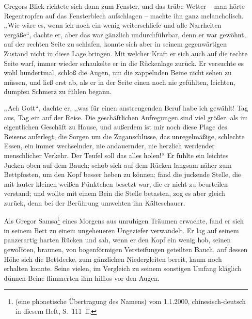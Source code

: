\documentclass[]{zchinr}
\begin{document}
Gregors Blick richtete sich dann zum Fenster, und das trübe Wetter -- man hörte Regentropfen auf das Fensterblech aufschlagen -- machte ihn ganz melancholisch. ,,Wie wäre es, wenn ich noch ein wenig weiterschliefe und alle Narrheiten vergäße``, dachte er, aber das war gänzlich undurchführbar, denn er war gewöhnt, auf der rechten Seite zu schlafen, konnte sich aber in seinem gegenwärtigen Zustand nicht in diese Lage bringen. Mit welcher Kraft er sich auch auf die rechte Seite warf, immer wieder schaukelte er in die Rückenlage zurück. Er versuchte es wohl hundertmal, schloß die Augen, um die zappelnden Beine nicht sehen zu müssen, und ließ erst ab, als er in der Seite einen noch nie gefühlten, leichten, dumpfen Schmerz zu fühlen begann.

,,Ach Gott``, dachte er, ,,was für einen anstrengenden Beruf habe ich gewählt! Tag aus, Tag ein auf der Reise. Die geschäftlichen Aufregungen sind viel größer, als im eigentlichen Geschäft zu Hause, und außerdem ist mir noch diese Plage des Reisens auferlegt, die Sorgen um die Zuganschlüsse, das unregelmäßige, schlechte Essen, ein immer wechselnder, nie andauernder, nie herzlich werdender menschlicher Verkehr. Der Teufel soll das alles holen!{}`` Er fühlte ein leichtes Jucken oben auf dem Bauch; schob sich auf dem Rücken langsam näher zum Bettpfosten, um den Kopf besser heben zu können; fand die juckende Stelle, die mit lauter kleinen weißen Pünktchen besetzt war, die er nicht zu beurteilen verstand; und wollte mit einem Bein die Stelle betasten, zog es aber gleich zurück, denn bei der Berührung umwehten ihn Kälteschauer.



\printtitle

Als Gregor Samsa\footnote{ (eine phonetische Übertragung des Namens) vom 1.1.2000, chinesisch-deutsch in diesem Heft, S.~111~ff.} eines Morgens aus unruhigen Träumen erwachte, fand er sich in seinem Bett zu einem ungeheueren Ungeziefer verwandelt. Er lag auf seinem panzerartig harten Rücken und sah, wenn er den Kopf ein wenig hob, seinen gewölbten, braunen, von bogenförmigen Versteifungen geteilten Bauch, auf dessen Höhe sich die Bettdecke, zum gänzlichen Niedergleiten bereit, kaum noch erhalten konnte. Seine vielen, im Vergleich zu seinem sonstigen Umfang kläglich dünnen Beine flimmerten ihm hilflos vor den Augen.
\end{document}
